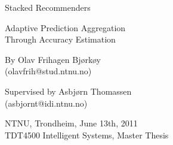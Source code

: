 \null\vspace{6em}
{
\setlength{\parindent}{0em}
\setlength{\parskip}{1em}
\centering

\HUGE
Stacked Recommenders\\
\LARGE
\vspace{1em}

Adaptive Prediction Aggregation\\
Through Accuracy Estimation\\

\vspace{2em}
\HUGE
\aldine
\LARGE
\vspace{1em}
\Large

By Olav Frihagen Bjørkøy\\
(olavfrih@stud.ntnu.no)\\

\vspace{1em}

Supervised by Asbjørn Thomassen\\
(asbjornt@idi.ntnu.no)\\

\vspace{1em}

NTNU, Trondheim, June 13th, 2011 \\
TDT4500 Intelligent Systems, Master Thesis \\

\vfill

}
\cleardoublepage
